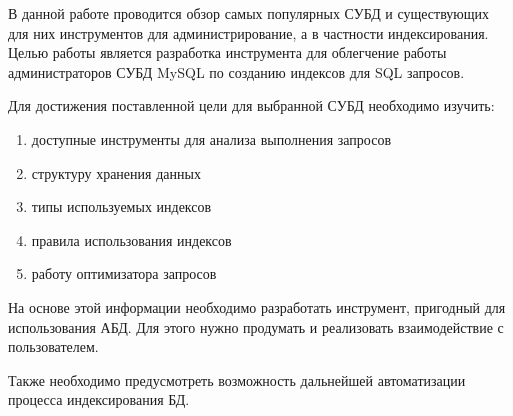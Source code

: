 В данной работе проводится обзор самых популярных СУБД и существующих для них инструментов для администрирование, а в частности индексирования.  Целью работы является разработка инструмента для облегчение работы администраторов СУБД MySQL по созданию индексов для SQL запросов.

Для достижения поставленной цели для выбранной СУБД необходимо изучить: 
\begin{enumerate}
\item доступные инструменты для анализа выполнения запросов
\item структуру хранения данных
\item типы используемых индексов
\item правила использования индексов
\item работу оптимизатора запросов
\end{enumerate}

На основе этой информации необходимо разработать инструмент, пригодный для использования АБД. Для этого нужно продумать и реализовать взаимодействие с пользователем.

Также необходимо предусмотреть возможность дальнейшей автоматизации процесса индексирования БД.